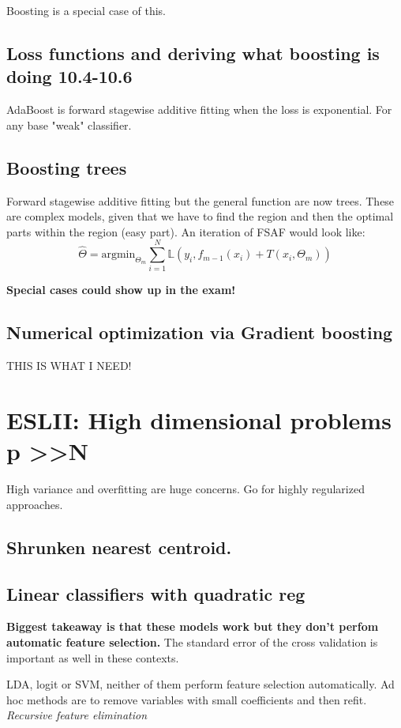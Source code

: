 \documentclass{article}
\begin{document}
Boosting is a special case of this.

\subsection{Loss functions and deriving what boosting is doing 10.4-10.6}

AdaBoost is forward stagewise additive fitting when the loss is exponential. For any base "weak" classifier.

\subsection{Boosting trees}
Forward stagewise additive fitting but the general function are now trees. These are complex models, given that we have to find the region and
then the optimal parts within the region (easy part).
An iteration of FSAF would look like: $$\hat{\Theta} = \text{argmin}_{\Theta_m} \sum_{i=1}^{N}\mathbb{L} (y_i,f_{m-1}(x_i) + T(x_i, \Theta_m))$$


\textbf{Special cases could show up in the exam!}

\subsection{Numerical optimization via Gradient boosting}
THIS IS WHAT I NEED!





\section{ESLII: High dimensional problems p >>N}
High variance and overfitting are huge concerns.
Go for highly regularized approaches.

\subsection{Shrunken nearest centroid.}


\subsection{Linear classifiers with quadratic reg}
\textbf{Biggest takeaway is that these models work but they don't perfom automatic feature selection.}
The standard error of the cross validation is important as well in these contexts.

LDA, logit or SVM, neither of them perform feature selection automatically.
Ad hoc methods are to remove variables with small coefficients and then refit. \textit{Recursive feature elimination}
\end{document}
